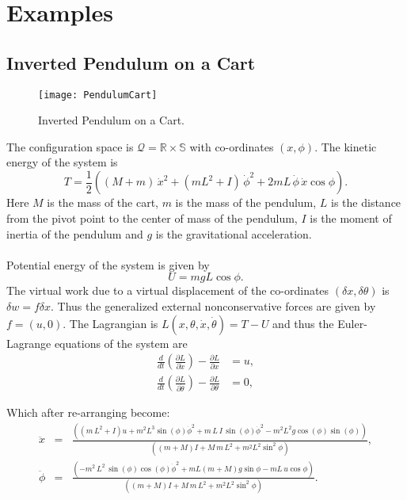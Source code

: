 \documentclass[graybox,envcountchap,sectrefs]{svmonoMuga}
\begin{document}
\section{Examples}
\subsection{Inverted Pendulum on a Cart}
\begin{figure}[ht]
\begin{center}
 \texttt{[image: PendulumCart]}\\
\renewcommand{\baselinestretch}{1}\selectfont
\caption{Inverted Pendulum on a Cart.}
\label{Fig:InvertedPendulum}
\renewcommand{\baselinestretch}{1.5}\selectfont
\end{center}
\end{figure}


The configuration space is $\mathcal{Q}=\mathbb{R}\times \mathbb{S}$ with co-ordinates $(x,\phi)$.
The kinetic energy of the system is
\begin{equation}\label{eq:KE}
T=\frac{1}{2}\left((M+m)\,\dot{x}^2+(mL^2+I)\,\dot{\phi}^2+2mL\,\dot{\phi}\,\dot{x}\cos{\phi}\right).
\end{equation}
Here $M$ is the mass of the cart, $m$ is the mass of the pendulum, $L$ is the distance from the pivot point to the center of mass of the pendulum,
$I$ is the moment of inertia of the pendulum and $g$ is the gravitational acceleration.
\\
\\
Potential energy of the system is given by 
\begin{equation}\label{eq:PE}
U=mgL\cos\phi.
\end{equation}
The virtual work due to a virtual displacement of the co-ordinates $(\delta x,\delta \theta)$ is $\delta w=f \delta x$.
Thus the generalized external nonconservative forces are given by
$f=(u,0)$.
The Lagrangian is $L(x,\theta,\dot{x},\dot{\theta})=T-U$ and thus the Euler-Lagrange equations of the system are
\begin{align*}
\frac{d}{dt}\left(\frac{\partial L}{\partial{\dot{x}}}\right)-\frac{\partial L}{\partial{x}}&=u,\\
\frac{d}{dt}\left(\frac{\partial L}{\partial{\dot{\theta}}}\right)-\frac{\partial L}{\partial{\theta}}&=0,
\end{align*}

Which after re-arranging become:
\begin{eqnarray}
\ddot{x}&=&\frac{\left(\left( m\,{L}^{2}+I \right) u+{m}^{2}{L}^{3}\sin \left( { {\phi}} \right) {{ \dot{\phi}}}^{2}+m\,L\,I\,\sin \left( { {\phi}} \right) {{ \dot{\phi}}}^{2}-{m}^{2}{L}^{2}g\cos \left( { {\phi}} \right) \sin \left( { {\phi}} \right)\right)}{\left((m+M)I+M\,m\,{L}^{2}+{m}^{2}{L}^{2} \sin^2 {\phi}\right)} ,\label{eq:xddot}\\
\ddot{\phi}&=&\frac{ \left( -m^2\,L^2\,\sin \left( {\phi} \right)\cos \left( {\phi} \right) {{\dot{\phi}}}^{2}+mL(m+M)g\sin{\phi}-mL\,u\cos{\phi} \right)}{\left((m+M)I+M\,m\,{L}^{2}+{m}^{2}{L}^{2} \sin^2 {\phi}\right)}.\label{eq:thetaddot}
\end{eqnarray}
\end{document}
